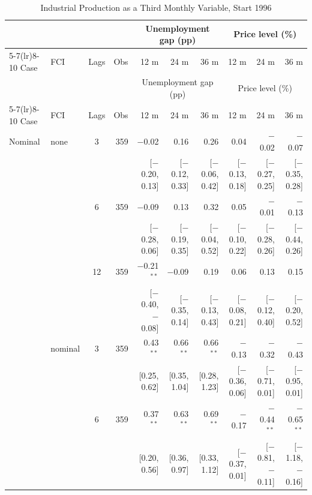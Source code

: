 \begingroup\scriptsize\setlength{\tabcolsep}{0.9pt}
\begin{longtable}{llcrrrrrrr}
\caption{Industrial Production as a Third Monthly Variable, Start 1996}\label{tab:appR7}\\
\toprule
 & & & & \multicolumn{3}{c}{Unemployment gap (pp)} & \multicolumn{3}{c}{Price level (\%)}\\ \cmidrule(lr){5-7}\cmidrule(lr){8-10}
Case & FCI & Lags & Obs & 12 m & 24 m & 36 m & 12 m & 24 m & 36 m\\
\midrule\endfirsthead
\toprule
 & & & & \multicolumn{3}{c}{Unemployment gap (pp)} & \multicolumn{3}{c}{Price level (\%)}\\ \cmidrule(lr){5-7}\cmidrule(lr){8-10}
Case & FCI & Lags & Obs & 12 m & 24 m & 36 m & 12 m & 24 m & 36 m\\
\midrule\endhead
\bottomrule\endfoot
Nominal & none & 3 & 359 & $-$0.02 & 0.16 & 0.26 & 0.04 & $-$0.02 & $-$0.07\\
 & & & & {\scriptsize [$-$0.20, 0.13]} & {\scriptsize [$-$0.12, 0.33]} & {\scriptsize [$-$0.06, 0.42]} & {\scriptsize [$-$0.13, 0.18]} & {\scriptsize [$-$0.27, 0.25]} & {\scriptsize [$-$0.35, 0.28]}\\
 &  & 6 & 359 & $-$0.09 & 0.13 & 0.32 & 0.05 & $-$0.01 & $-$0.13\\
 & & & & {\scriptsize [$-$0.28, 0.06]} & {\scriptsize [$-$0.19, 0.35]} & {\scriptsize [$-$0.04, 0.52]} & {\scriptsize [$-$0.10, 0.22]} & {\scriptsize [$-$0.28, 0.26]} & {\scriptsize [$-$0.44, 0.26]}\\
 &  & 12 & 359 & $-$0.21$^{**}$ & $-$0.09 & 0.19 & 0.06 & 0.13 & 0.15\\
 & & & & {\scriptsize [$-$0.40, $-$0.08]} & {\scriptsize [$-$0.35, 0.14]} & {\scriptsize [$-$0.13, 0.43]} & {\scriptsize [$-$0.08, 0.21]} & {\scriptsize [$-$0.12, 0.40]} & {\scriptsize [$-$0.20, 0.52]}\\
 & nominal & 3 & 359 & 0.43$^{**}$ & 0.66$^{**}$ & 0.66$^{**}$ & $-$0.13 & $-$0.32 & $-$0.43\\
 & & & & {\scriptsize [0.25, 0.62]} & {\scriptsize [0.35, 1.04]} & {\scriptsize [0.28, 1.23]} & {\scriptsize [$-$0.36, 0.06]} & {\scriptsize [$-$0.71, 0.01]} & {\scriptsize [$-$0.95, 0.01]}\\
 &  & 6 & 359 & 0.37$^{**}$ & 0.63$^{**}$ & 0.69$^{**}$ & $-$0.17 & $-$0.44$^{**}$ & $-$0.65$^{**}$\\
 & & & & {\scriptsize [0.20, 0.56]} & {\scriptsize [0.36, 0.97]} & {\scriptsize [0.33, 1.12]} & {\scriptsize [$-$0.37, 0.01]} & {\scriptsize [$-$0.81, $-$0.11]} & {\scriptsize [$-$1.18, $-$0.16]}\\

\end{longtable}
